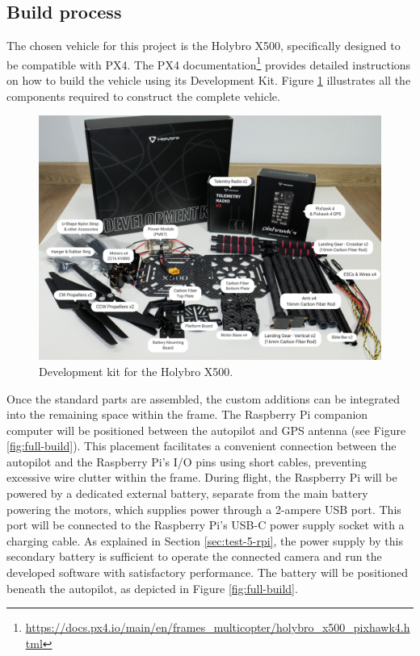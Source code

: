 \subsection{Build process}
\label{sec:test-7-builddrone}

The chosen vehicle for this project is the Holybro X500, specifically designed to be compatible with PX4. The PX4 documentation\footnote{\url{https://docs.px4.io/main/en/frames_multicopter/holybro_x500_pixhawk4.html}} provides detailed instructions on how to build the vehicle using its Development Kit. Figure \ref{fig:x500-dev-kit} illustrates all the components required to construct the complete vehicle.

\begin{figure}[H]
  \centering
  \includegraphics[width=.9\textwidth, keepaspectratio]{img/x500-dev-kit.jpg}
  \caption{Development kit for the Holybro X500.}
  \label{fig:x500-dev-kit}
\end{figure}


Once the standard parts are assembled, the custom additions can be integrated into the remaining space within the frame. The Raspberry Pi companion computer will be positioned between the autopilot and GPS antenna (see Figure \ref{fig:full-build}). This placement facilitates a convenient connection between the autopilot and the Raspberry Pi's I/O pins using short cables, preventing excessive wire clutter within the frame. During flight, the Raspberry Pi will be powered by a dedicated external battery, separate from the main battery powering the motors, which supplies power through a 2-ampere USB port. This port will be connected to the Raspberry Pi's USB-C power supply socket with a charging cable. As explained in Section \ref{sec:test-5-rpi}, the power supply by this secondary battery is sufficient to operate the connected camera and run the developed software with satisfactory performance. The battery will be positioned beneath the autopilot, as depicted in Figure \ref{fig:full-build}. 


